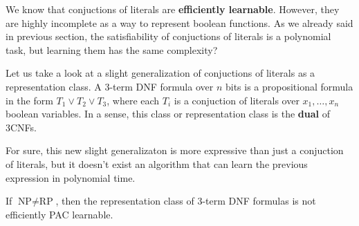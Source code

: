 We know that conjuctions of literals are \textbf{efficiently learnable}. However, they are highly incomplete as a way to represent boolean functions. As we already
said in previous section, the satisfiability of conjuctions of literals is a polynomial task, but learning them has the same complexity? \vspace{7pt}

Let us take a look at a slight generalization of conjuctions of literals as a representation class. A 3-term DNF formula over $n$ bits is a propositional 
formula in the form $T_1 \vee T_2 \vee T_3$, where each $T_i$ is a conjuction of literals over $x_1, \dots, x_n$ boolean variables. In a sense, this class 
or representation class is the \textbf{dual} of 3CNFs. \vspace{7pt}

For sure, this new slight generalizaton is more expressive than just a conjuction of literals, but it doesn't exist an algorithm that can learn the previous expression 
in polynomial time. \vspace{7pt}

\begin{definition}[title = Theorem]
    If $\text{NP} \neq \text{RP}$, then the representation class of 3-term DNF formulas is not efficiently PAC learnable.
\end{definition}